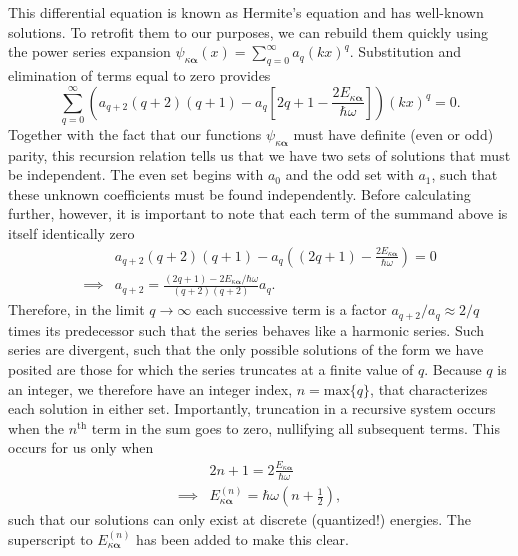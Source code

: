 \documentclass{article}
\numberwithin{equation}{section}
\begin{document}
This differential equation is known as Hermite's equation and has well-known solutions. To retrofit them to our purposes, we can rebuild them quickly using the power series expansion $\psi_{\kappa\bm{\alpha}}(x) = \sum_{q = 0}^\infty a_q(kx)^q$. Substitution and elimination of terms equal to zero provides
\begin{equation}
\sum_{q = 0}^\infty\left(a_{q + 2}(q + 2)(q + 1) - a_q\left[2q + 1 - \frac{2E_{\kappa\bm{\alpha}}}{\hbar\omega}\right]\right)(kx)^q = 0.
\end{equation}
Together with the fact that our functions $\psi_{\kappa\bm{\alpha}}$ must have definite (even or odd) parity, this recursion relation tells us that we have two sets of solutions that must be independent. The even set begins with $a_0$ and the odd set with $a_1$, such that these unknown coefficients must be found independently. Before calculating further, however, it is important to note that each term of the summand above is itself identically zero
\begin{equation}
\begin{split}
&a_{q + 2}(q + 2)(q + 1) - a_q\left((2q + 1) - \frac{2E_{\kappa\bm{\alpha}}}{\hbar\omega}\right) = 0\\
\implies &a_{q + 2} = \frac{(2q + 1) - 2E_{\kappa\bm{\alpha}}/\hbar\omega}{(q + 2)(q + 2)}a_q.
\end{split}
\end{equation}
Therefore, in the limit $q\to\infty$ each successive term is a factor $a_{q+2}/a_q\approx2/q$ times its predecessor such that the series behaves like a harmonic series. Such series are divergent, such that the only possible solutions of the form we have posited are those for which the series truncates at a finite value of $q$. Because $q$ is an integer, we therefore have an integer index, $n = \mathrm{max}\{q\}$, that characterizes each solution in either set. Importantly, truncation in a recursive system occurs when the $n^\mathrm{th}$ term in the sum goes to zero, nullifying all subsequent terms. This occurs for us only when
\begin{equation}
\begin{split}
&2n + 1 = 2\frac{E_{\kappa\bm{\alpha}}}{\hbar\omega}\\
\implies &E_{\kappa\bm{\alpha}}^{(n)} = \hbar\omega\left(n + \frac{1}{2}\right),
\end{split}
\end{equation}
such that our solutions can only exist at discrete (quantized!) energies. The superscript to $E_{\kappa\bm{\alpha}}^{(n)}$ has been added to make this clear.
\end{document}
